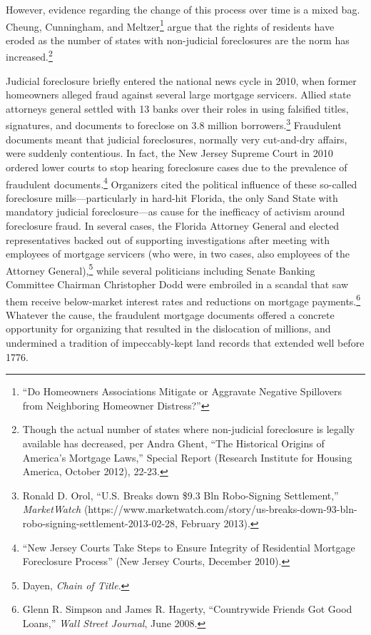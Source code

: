 \documentclass[12pt,oneside]{psthesis}
\begin{document}
However, evidence regarding the change of this process over time is a mixed bag.
Cheung, Cunningham, and Meltzer\footnote{``Do Homeowners Associations Mitigate or Aggravate Negative Spillovers from Neighboring Homeowner Distress?''} argue that the rights of residents have eroded as the number of states with non-judicial foreclosures are the norm has increased.\footnote{Though the actual number of states where non-judicial foreclosure is legally available has decreased, per Andra Ghent, ``The Historical Origins of America's Mortgage Laws,'' Special Report (Research Institute for Housing America, October 2012), 22-23.}

Judicial foreclosure briefly entered the national news cycle in 2010, when former homeowners alleged fraud against several large mortgage servicers.
Allied state attorneys general settled with 13 banks over their roles in using falsified titles, signatures, and documents to foreclose on 3.8 million borrowers.\footnote{Ronald D. Orol, ``U.S. Breaks down \$9.3 Bln Robo-Signing Settlement,'' \emph{MarketWatch} (https://www.marketwatch.com/story/us-breaks-down-93-bln-robo-signing-settlement-2013-02-28, February 2013).}
Fraudulent documents meant that judicial foreclosures, normally very cut-and-dry affairs, were suddenly contentious.
In fact, the New Jersey Supreme Court in 2010 ordered lower courts to stop hearing foreclosure cases due to the prevalence of fraudulent documents.\footnote{``New Jersey Courts Take Steps to Ensure Integrity of Residential Mortgage Foreclosure Process'' (New Jersey Courts, December 2010).}
Organizers cited the political influence of these so-called foreclosure mills---particularly in hard-hit Florida, the only Sand State with mandatory judicial foreclosure---as cause for the inefficacy of activism around foreclosure fraud.
In several cases, the Florida Attorney General and elected representatives backed out of supporting investigations after meeting with employees of mortgage servicers (who were, in two cases, also employees of the Attorney General),\footnote{Dayen, \emph{Chain of Title}.} while several politicians including Senate Banking Committee Chairman Christopher Dodd were embroiled in a scandal that saw them receive below-market interest rates and reductions on mortgage payments.\footnote{Glenn R. Simpson and James R. Hagerty, ``Countrywide Friends Got Good Loans,'' \emph{Wall Street Journal}, June 2008.}
Whatever the cause, the fraudulent mortgage documents offered a concrete opportunity for organizing that resulted in the dislocation of millions, and undermined a tradition of impeccably-kept land records that extended well before 1776.
\end{document}
